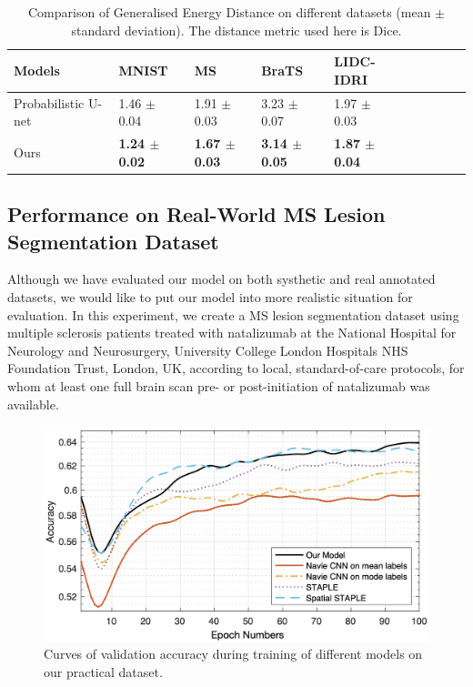 \begin{table}[!h]
	\center
	\scriptsize
	\begin{tabular}{@{}llllllllll}
		\hline
		 Models & MNIST & MS  & BraTS  & LIDC-IDRI  \\
		\hline	
		Probabilistic U-net \cite{kohl2018probabilistic}  & 1.46 $\pm$ 0.04 & 1.91 $\pm$ 0.03  & 3.23 $\pm$ 0.07  &  1.97 $\pm$ 0.03  \\
		Ours & \textbf{1.24 $\pm$ 0.02} & \textbf{1.67 $\pm$ 0.03}  & \textbf{3.14 $\pm$ 0.05}  &  \textbf{1.87 $\pm$ 0.04}  \\
		\hline
	\end{tabular}%
\caption{Comparison of Generalised Energy Distance on different datasets (mean $\pm$ standard deviation). The distance metric used here is Dice.}
\label{ged_result}
\end{table}

\subsection{Performance on Real-World MS Lesion Segmentation Dataset}

Although we have evaluated our model on both systhetic and real annotated datasets, we would like to put our model into more realistic situation for evaluation. In this experiment, we create a MS lesion segmentation dataset using multiple sclerosis patients treated with natalizumab at the National Hospital for Neurology and Neurosurgery, University College London Hospitals NHS Foundation Trust, London, UK, according to local, standard-of-care protocols, for whom at least one full brain scan pre- or post-initiation of natalizumab was available.

\begin{figure}
        \center
        \includegraphics[width=\linewidth]{chapter_8/picture94.png}
        \caption{Curves of validation accuracy during training of different models on our practical dataset.}
        \label{val-acc}
\end{figure}

